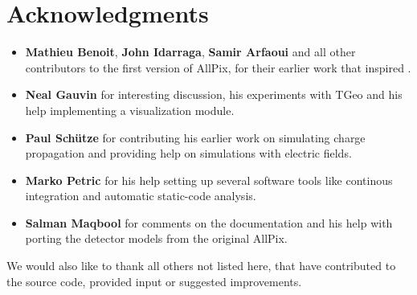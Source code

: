 \section{Acknowledgments}
\begin{itemize}
\item \textbf{Mathieu Benoit}, \textbf{John Idarraga}, \textbf{Samir Arfaoui} and all other contributors to the first version of AllPix, for their earlier work that inspired \apsq.
\item \textbf{Neal Gauvin} for interesting discussion, his experiments with TGeo and his help implementing a visualization module.
\item \textbf{Paul Sch\"utze} for contributing his earlier work on simulating charge propagation and providing help on simulations with electric fields.
\item \textbf{Marko Petric} for his help setting up several software tools like continous integration and automatic static-code analysis.
\item \textbf{Salman Maqbool} for comments on the documentation and his help with porting the detector models from the original AllPix.
\end{itemize}
We would also like to thank all others not listed here, that have contributed to the source code, provided input or suggested improvements. 

